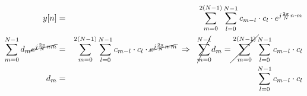 \begin{uebsp}
\begin{Answer}
\begin{enumerate}[a)]
            \begin{eqnarray*}
                y[n]&=& \sum_{m=0}^{2(N-1)}\sum_{l=0}^{N-1}c_{m-l}\cdot c_l\cdot e^{j\frac{2\pi}{N}n\cdot m}\\
                \sum_{m=0}^{N-1}d_m\cancel{e^{j\frac{2\pi}{N}nm}}&=& \sum_{m=0}^{2(N-1)}\sum_{l=0}^{N-1}c_{m-l}\cdot c_l\cdot \cancel{e^{j\frac{2\pi}{N}n\cdot m}}\;\Rightarrow\;\;
                \cancel{\sum_{m=0}^{N-1}}d_m= \cancel{\sum_{m=0}^{2(N-1)}}\sum_{l=0}^{N-1}c_{m-l}\cdot c_l\\
                d_m&=&\sum_{l=0}^{N-1}c_{m-l}\cdot c_l
            \end{eqnarray*}
    \end{enumerate}
\end{Answer}
\end{uebsp}
